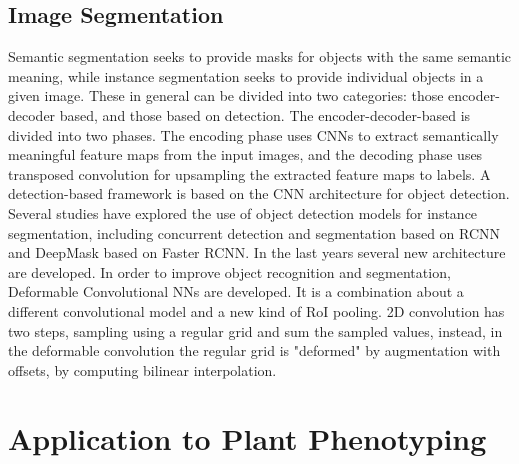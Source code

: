 \subsection{Image Segmentation}
Semantic segmentation seeks to provide masks for objects with the same semantic meaning, while instance segmentation seeks to provide individual objects in a given image.
These in general can be divided into two categories: those encoder-decoder based, and those based on detection. The encoder-decoder-based is divided into two phases.
The encoding phase uses CNNs to extract semantically meaningful feature maps from the input images, and the decoding phase uses transposed convolution for upsampling
the extracted feature maps to labels. A detection-based framework is based on the CNN architecture for object detection. Several studies have explored the use of
object detection models for instance segmentation, including concurrent detection and segmentation based on RCNN and DeepMask based on Faster RCNN.
In the last years several new architecture are developed. In order to improve object recognition and segmentation, Deformable Convolutional NNs \cite{dai2017deformable} are developed.
It is a combination about a different convolutional model and a new kind of RoI pooling. 2D convolution has two steps, sampling using a regular grid and sum the sampled
values, instead, in the deformable convolution the regular grid is "deformed" by augmentation with offsets, by computing bilinear interpolation.


\section{Application to Plant Phenotyping}
